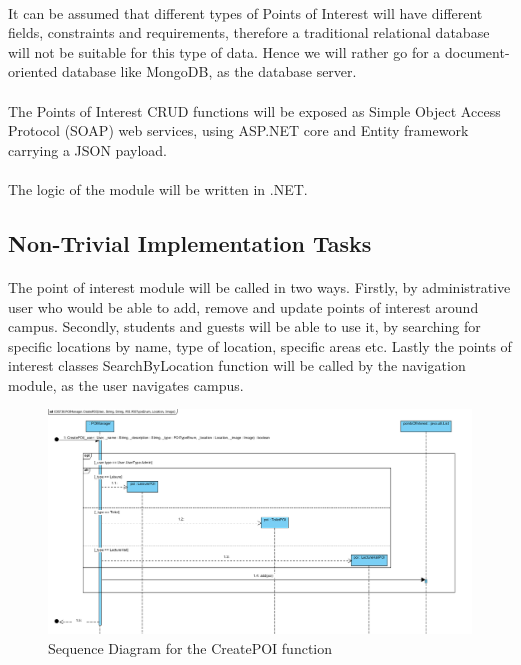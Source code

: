 \paragraph{}It can be assumed that different types of Points of Interest will have different fields, constraints and 
requirements, therefore a traditional relational database will not be suitable for this type of data. Hence we will 
rather go for a document-oriented database like MongoDB, as the database server.

\paragraph{}The Points of Interest CRUD functions will be exposed as Simple Object Access Protocol (SOAP) web services, 
using ASP.NET core and Entity framework carrying a JSON payload.

\paragraph{}The logic of the module will be written in .NET.


\subsection{Non-Trivial Implementation Tasks}

\paragraph{}The point of interest module will be called in two ways. Firstly, by administrative user who would be able to add, remove and 
update points of interest around campus. Secondly, students and guests will be able to use it, by searching for specific locations by name,
type of location, specific areas etc. Lastly the points of interest classes SearchByLocation function will be called by the navigation module,
as the user navigates campus.

\begin{figure}[!htb]
\includegraphics[width=\textwidth]{Images/CreatePOI_Sequence.png}
\caption{Sequence Diagram for the CreatePOI function}
\end{figure}

